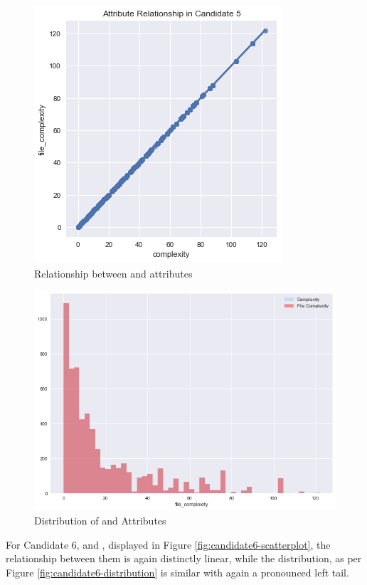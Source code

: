 \begin{enumerate}
\begin{figure}[!h]
    \centering
    \includegraphics[scale=0.7]{Figures/correlation/Attribute_Relationship_in_Candidate_5.png}
    \caption{Relationship between \complexity{} and \fileComplexity{} attributes}
    \label{fig:candidate5-pairplot}
\end{figure}

\begin{figure}[!h]
    \centering
    \includegraphics[scale=0.6]{Figures/correlation/Attribute_Distribution_in_Candidate_5.png}
    \caption{Distribution of \complexity{} and \fileComplexity{} Attributes}
    \label{fig:candidate5-distribution}
\end{figure}

For Candidate 6, \statements{} and \linesToCover{}, displayed in Figure \ref{fig:candidate6-scatterplot}, the relationship between them is again distinctly linear, while the distribution, as per Figure \ref{fig:candidate6-distribution} is similar with again a pronounced left tail. 


\end{enumerate}
